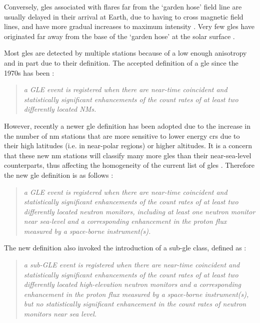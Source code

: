 Conversely, \glspl{gle} associated with flares far from the `garden hose' field line are usually delayed in their arrival at Earth, due to having to cross magnetic field lines, and have more gradual increases to maximum intensity \citep{duldig_ground_1993}. Very few \glspl{gle} have originated far away from the base of the `garden hose' at the solar surface \citep{duldig_ground_1993, andriopoulou_intense_2011}.

Most \glspl{gle} are detected by multiple stations because of a low enough anisotropy \citep{strauss_pulse_2017,belov_global_2018} and in part due to their definition. The accepted definition of a \gls{gle} since the 1970s has been \citep{poluianov_gle_2017}: 

\begin{quote}
	\textit{a GLE event is registered when there are near-time coincident and statistically significant enhancements of the count rates of at least two differently located NMs.}
\end{quote}

However, recently a newer \gls{gle} definition has been adopted due to the increase in the number of \gls{nm} stations that are more sensitive to lower energy \glspl{cr} due to their high latitudes (i.e. in near-polar regions) or higher altitudes. It is a concern that these new \gls{nm} stations will classify many more \glspl{gle} than their near-sea-level counterparts, thus affecting the homogeneity of the current list of \glspl{gle} \citep{poluianov_gle_2017}. Therefore the new \gls{gle} definition is as follows \citep{poluianov_gle_2017}: 

\begin{quote}
	\textit{a GLE event is registered when there are near-time coincident and statistically significant enhancements of the count rates of at least two differently located neutron monitors, including at least one neutron monitor near sea-level and a corresponding enhancement in the proton flux measured by a space-borne instrument(s).}
\end{quote}

The new definition also invoked the introduction of a sub-\gls{gle} class, defined as \citep{poluianov_gle_2017}:

\begin{quote}
	\textit{a sub-GLE event is registered when there are near-time coincident and statistically significant enhancements of the count rates of at least two differently located high-elevation neutron monitors and a corresponding enhancement in the proton flux measured by a space-borne instrument(s), but no statistically significant enhancement in the count rates of neutron monitors near sea level.}
\end{quote}


